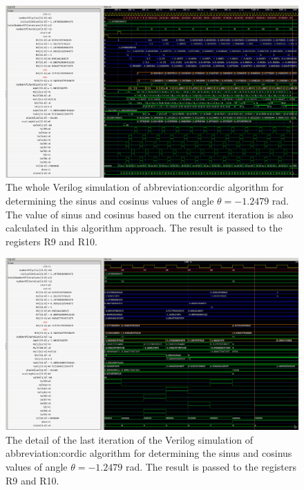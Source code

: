 \documentclass[a4paper, twoside, 11pt]{article}
\begin{document}
        \begin{figure}[htbp!]
            \centering
            \includegraphics[width=1\textwidth]{src/png/cordic-verilog-whole-sim.png}
            \caption{The whole Verilog simulation of \gls{abbreviation:cordic} algorithm for determining the sinus and cosinus values of angle $\theta = -1.2479$ rad. The value of sinus and cosinus based on the current iteration is also calculated in this algorithm approach. The result is passed to the registers R9 and R10.}
            \label{fig:cordic-verilog-whole-sim}
        \end{figure}

        \begin{figure}[htbp!]
            \centering
            \includegraphics[width=1\textwidth]{src/png/cordic-verilog-end-of-the-simulation.png}
            \caption{The detail of the last iteration of the Verilog simulation of \gls{abbreviation:cordic} algorithm for determining the sinus and cosinus values of angle $\theta = -1.2479$ rad. The result is passed to the registers R9 and R10.}
            \label{fig:cordic-verilog-end-of-the-simulation}
        \end{figure}
\end{document}
